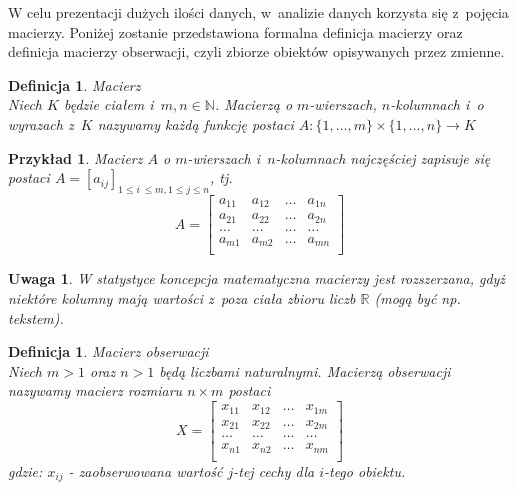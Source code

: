 \documentclass[12pt,a4paper]{report}
\newtheorem{definition}[theorem]{Definicja}
\newtheorem{uwaga}{Uwaga}
\newtheorem{example}{Przykład}
\begin{document}
W celu prezentacji dużych ilości danych, w~analizie danych korzysta się z~pojęcia macierzy. Poniżej zostanie przedstawiona formalna definicja macierzy oraz definicja macierzy obserwacji, czyli zbiorze obiektów opisywanych przez zmienne. %

\begin{definition}{Macierz \cite[Rozdział 1]{banaszak2002}}\\
Niech $K$ będzie ciałem i~$m, n \in \mathbb{N}$. Macierzą o $m$-wierszach, $n$-kolumnach i~o wyrazach z~$K$ nazywamy każdą funkcję postaci
$A: \{1,\ldots, m \} \times \{1, \ldots, n\} \rightarrow K$
\end{definition}

\begin{example}
Macierz $A$ o $m$-wierszach i~$n$-kolumnach najczęściej zapisuje się postaci $A=[a_{ij}]_{1\leq i~\leq m,  1\leq j\leq n}$, tj. 
$$
A= \begin{bmatrix}
a_{11} & a_{12} & \ldots & a_{1n} \\
a_{21} & a_{22} & \ldots & a_{2n}\\ 
\ldots & \ldots & \ldots & \ldots\\
a_{m1} & a_{m2} & \ldots & a_{mn} \\
\end{bmatrix}    
$$
\end{example}

\begin{uwaga}
W statystyce koncepcja matematyczna macierzy jest rozszerzana, gdyż niektóre kolumny mają wartości z~poza ciała zbioru liczb $\mathbb{R}$ (mogą być np. tekstem).
\end{uwaga}

\begin{definition}{Macierz obserwacji \cite[Rozdział 2]{mlodak2006}}\\
Niech $m>1$ oraz $n>1$ będą liczbami naturalnymi.  Macierzą obserwacji nazywamy macierz rozmiaru  $n \times m$  postaci
$$
X= \begin{bmatrix}
x_{11} & x_{12} & \ldots & x_{1m} \\
x_{21} & x_{22} & \ldots & x_{2m}\\
\ldots & \ldots & \ldots & \ldots \\
x_{n1} & x_{n2} & \ldots & x_{nm}\\
\end{bmatrix}
$$
gdzie:
$x_{ij}$ - zaobserwowana wartość $j$-tej cechy dla $i$-tego obiektu.
\end{definition}
\end{document}
